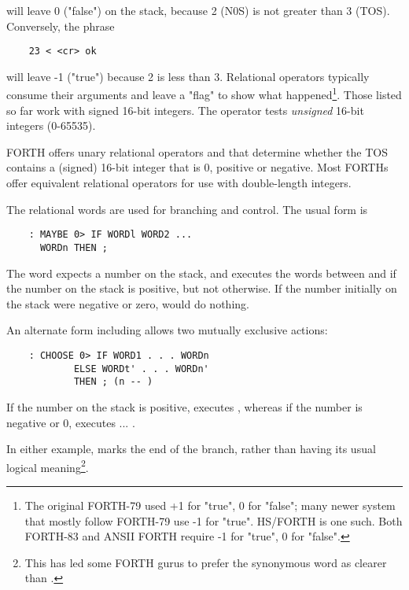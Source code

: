 will leave 0 ("false") on the stack, because 2 (N0S) is not greater
than 3 (TOS). Conversely, the phrase

\begin{lstlisting}
    23 < <cr> ok
\end{lstlisting}

will leave -1 ("true") because 2 is less than 3. Relational operators typically consume their arguments and leave a "ﬂag" to show what happened\footnote{The original FORTH-79 used +1 for "true", 0 for "false"; many newer system that mostly follow FORTH-79 use -1 for "true". HS/FORTH is one such. Both FORTH-83 and ANSII FORTH require -1 for "true", 0 for "false".}. Those listed so far work with signed 16-bit integers. The operator  tests \textit{unsigned} 16-bit integers (0-65535).

FORTH offers unary relational operators  and  that determine whether the TOS contains a (signed) 16-bit integer that is 0, positive or negative. Most FORTHs offer equivalent relational operators for use with double-length integers.

The relational words are used for branching and control. The usual form is

\begin{lstlisting}
    : MAYBE 0> IF WORDl WORD2 ...
      WORDn THEN ;
\end{lstlisting}

The word  expects a number on the stack, and executes the words between  and  if the number on the stack is positive, but not otherwise. If the number initially on the stack were negative or zero,  would do nothing.

An alternate form including  allows two mutually exclusive actions:

\begin{lstlisting}
    : CHOOSE 0> IF WORD1 . . . WORDn
            ELSE WORDt' . . . WORDn'
            THEN ; (n -- )
\end{lstlisting}

If the number on the stack is positive,  executes , whereas if the number is negative or 0,  executes  ... .

In either example,  marks the end of the branch, rather than having its usual logical meaning\footnote{This has led some FORTH gurus to prefer the synonymous word  as clearer than .}.

